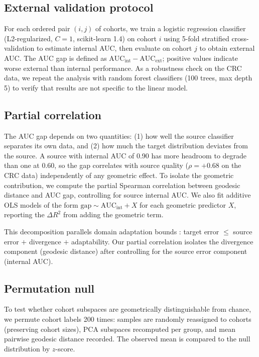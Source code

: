 \documentclass{article}
\begin{document}
\subsection{External validation protocol}

For each ordered pair $(i, j)$ of cohorts, we train a logistic regression classifier (L2-regularized, $C = 1$, scikit-learn 1.4) on cohort $i$ using 5-fold stratified cross-validation to estimate internal AUC, then evaluate on cohort $j$ to obtain external AUC. The AUC gap is defined as $\text{AUC}_{\mathrm{int}} - \text{AUC}_{\mathrm{ext}}$; positive values indicate worse external than internal performance. As a robustness check on the CRC data, we repeat the analysis with random forest classifiers (100 trees, max depth 5) to verify that results are not specific to the linear model.

\subsection{Partial correlation}

The AUC gap depends on two quantities: (1) how well the source classifier separates its own data, and (2) how much the target distribution deviates from the source. A source with internal AUC of 0.90 has more headroom to degrade than one at 0.60, so the gap correlates with source quality ($\rho = +0.68$ on the CRC data) independently of any geometric effect. To isolate the geometric contribution, we compute the partial Spearman correlation between geodesic distance and AUC gap, controlling for source internal AUC. We also fit additive OLS models of the form $\mathrm{gap} \sim \mathrm{AUC_{int}} + X$ for each geometric predictor $X$, reporting the $\Delta R^2$ from adding the geometric term.

This decomposition parallels domain adaptation bounds \citep{bendavid2010theory, mansour2009domain}: target error $\leq$ source error $+$ divergence $+$ adaptability. Our partial correlation isolates the divergence component (geodesic distance) after controlling for the source error component (internal AUC).

\subsection{Permutation null}

To test whether cohort subspaces are geometrically distinguishable from chance, we permute cohort labels 200 times: samples are randomly reassigned to cohorts (preserving cohort sizes), PCA subspaces recomputed per group, and mean pairwise geodesic distance recorded. The observed mean is compared to the null distribution by $z$-score.
\end{document}
